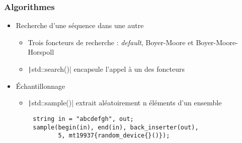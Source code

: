 \documentclass[C++.tex]{subfiles}
\begin{document}
\begin{frame}[fragile]
	\frametitle{Algorithmes}
	\begin{itemize}
		\item Recherche d'une séquence dans une autre
		\begin{itemize}
			\item Trois foncteurs de recherche : \textit{default}, Boyer-Moore et Boyer-Moore-Horspoll
			\item \texttt|std::search()| encapsule l'appel à un des foncteurs
		\end{itemize}
		\item Échantillonnage
		\begin{itemize}
			\item \texttt|std::sample()| extrait aléatoirement n éléments d'un ensemble
		\end{itemize}
	\end{itemize}

	\begin{verbatim}
		string in = "abcdefgh", out;
		sample(begin(in), end(in), back_inserter(out),
		       5, mt19937{random_device{}()});
	\end{verbatim}


\end{frame}
\end{document}
